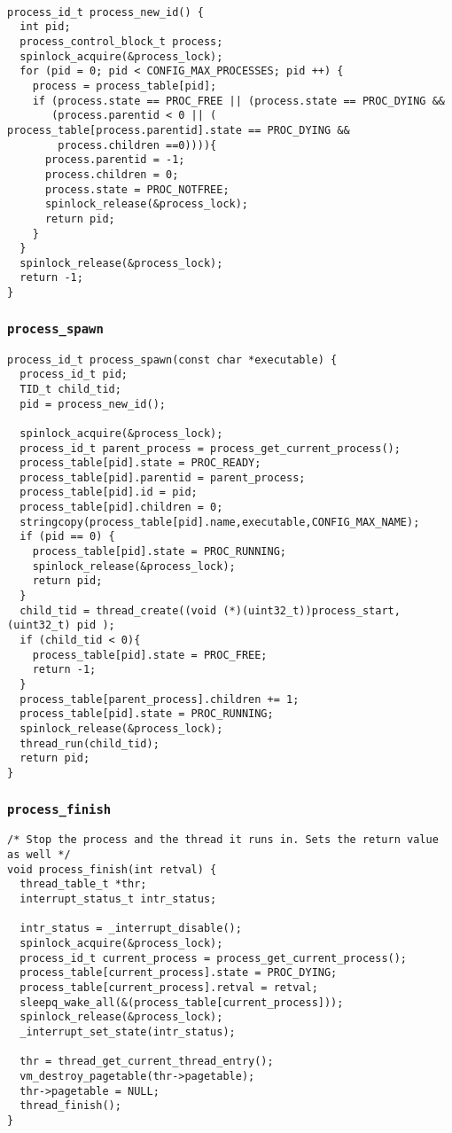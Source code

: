 \documentclass[a4paper,12pt]{article}
\begin{document}
\begin{lstlisting}

process_id_t process_new_id() {
  int pid;
  process_control_block_t process;
  spinlock_acquire(&process_lock);
  for (pid = 0; pid < CONFIG_MAX_PROCESSES; pid ++) {
    process = process_table[pid];
    if (process.state == PROC_FREE || (process.state == PROC_DYING && 
       (process.parentid < 0 || ( process_table[process.parentid].state == PROC_DYING &&
        process.children ==0)))){
      process.parentid = -1;
      process.children = 0;
      process.state = PROC_NOTFREE;
      spinlock_release(&process_lock);
      return pid;
    }
  }
  spinlock_release(&process_lock);
  return -1;
}
\end{lstlisting}

\subsubsection{\texttt{process\_spawn}}
\begin{lstlisting}
process_id_t process_spawn(const char *executable) {
  process_id_t pid;
  TID_t child_tid;
  pid = process_new_id();

  spinlock_acquire(&process_lock);
  process_id_t parent_process = process_get_current_process();
  process_table[pid].state = PROC_READY;
  process_table[pid].parentid = parent_process;
  process_table[pid].id = pid;
  process_table[pid].children = 0;
  stringcopy(process_table[pid].name,executable,CONFIG_MAX_NAME);
  if (pid == 0) {
    process_table[pid].state = PROC_RUNNING;
    spinlock_release(&process_lock);
    return pid;
  }
  child_tid = thread_create((void (*)(uint32_t))process_start,(uint32_t) pid );
  if (child_tid < 0){
    process_table[pid].state = PROC_FREE;
    return -1;
  }
  process_table[parent_process].children += 1;
  process_table[pid].state = PROC_RUNNING;
  spinlock_release(&process_lock);
  thread_run(child_tid);
  return pid;
}
\end{lstlisting}

\subsubsection{\texttt{process\_finish}}
\begin{lstlisting}
/* Stop the process and the thread it runs in. Sets the return value as well */
void process_finish(int retval) {
  thread_table_t *thr;
  interrupt_status_t intr_status;
  
  intr_status = _interrupt_disable();
  spinlock_acquire(&process_lock);
  process_id_t current_process = process_get_current_process();
  process_table[current_process].state = PROC_DYING;
  process_table[current_process].retval = retval;
  sleepq_wake_all(&(process_table[current_process]));
  spinlock_release(&process_lock);
  _interrupt_set_state(intr_status);

  thr = thread_get_current_thread_entry();
  vm_destroy_pagetable(thr->pagetable);
  thr->pagetable = NULL;
  thread_finish();
}
\end{lstlisting}
\end{document}
